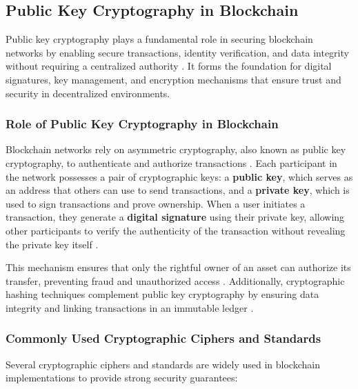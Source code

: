 \documentclass{article}
\begin{document}
\subsection{Public Key Cryptography in Blockchain}

Public key cryptography plays a fundamental role in securing blockchain networks by enabling secure transactions, identity verification, and data integrity without requiring a centralized authority \cite{narayanan2016bitcoin}. It forms the foundation for digital signatures, key management, and encryption mechanisms that ensure trust and security in decentralized environments.

\subsubsection{Role of Public Key Cryptography in Blockchain}
Blockchain networks rely on asymmetric cryptography, also known as public key cryptography, to authenticate and authorize transactions \cite{rivest1978method}. Each participant in the network possesses a pair of cryptographic keys: a \textbf{public key}, which serves as an address that others can use to send transactions, and a \textbf{private key}, which is used to sign transactions and prove ownership. When a user initiates a transaction, they generate a \textbf{digital signature} using their private key, allowing other participants to verify the authenticity of the transaction without revealing the private key itself \cite{menezes1996handbook}.

This mechanism ensures that only the rightful owner of an asset can authorize its transfer, preventing fraud and unauthorized access \cite{wood2014ethereum}. Additionally, cryptographic hashing techniques complement public key cryptography by ensuring data integrity and linking transactions in an immutable ledger \cite{merkle1988digital}.

\subsubsection{Commonly Used Cryptographic Ciphers and Standards}
Several cryptographic ciphers and standards are widely used in blockchain implementations to provide strong security guarantees:
\end{document}

